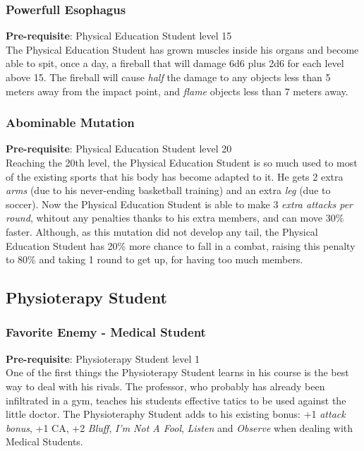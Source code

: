 \documentclass[ letterpaper,12pt]{article}
\begin{document}
\subsubsection{Powerfull Esophagus}
 {\bf Pre-requisite}: Physical Education Student level 15\\
 The Physical Education Student has grown muscles inside his organs and become able to spit, once a day, a fireball that will damage 6d6 plus 2d6 for each level above 15. The fireball will cause {\it half} the damage to any objects less than 5 meters away from the impact point, and {\it flame} objects less than 7 meters away.

\subsubsection{Abominable Mutation}
 {\bf Pre-requisite}: Physical Education Student level 20\\
 Reaching the 20th level, the Physical Education Student is so much used to most of the existing sports that his body has become adapted to it. He gets 2 extra {\it arms} (due to his never-ending basketball training) and an extra {\it leg} (due to soccer). Now the Physical Education Student is able to make 3 {\it extra attacks per round}, whitout any penalties thanks to his extra members, and can move 30\% faster. Although, as this mutation did not develop any tail, the Physical Education Student has 20\% more chance to fall in a combat, raising this penalty to 80\% and taking 1 round to get up, for having too much members.

\subsection{Physioterapy Student}

\subsubsection{Favorite Enemy - Medical Student}
 {\bf Pre-requisite}: Physioterapy Student level 1\\
 One of the first things the Physioterapy Student learns in his course is the best way to deal with his rivals. The professor, who probably has already been infiltrated in a gym, teaches his students effective tatics to be used against the little doctor. The Physioteraphy Student adds to his existing bonus: +1 {\it attack bonus}, +1 CA, +2 {\it Bluff}, {\it I'm Not A Fool}, {\it Listen} and {\it Observe} when dealing with Medical Students.
\end{document}
